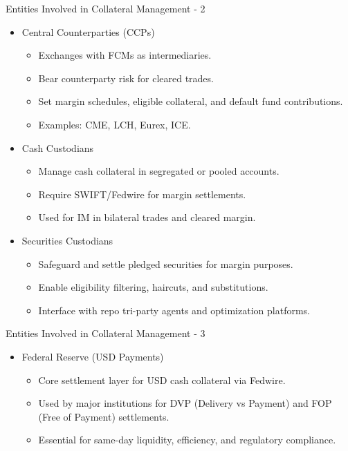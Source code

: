 \documentclass[handout, aspectratio=169]{beamer}
\begin{document}
\begin{frame}{Entities Involved in Collateral Management - 2}
  \begin{itemize}
    \item Central Counterparties (CCPs)
    \begin{itemize}
      \item Exchanges with FCMs as intermediaries.
      \item Bear counterparty risk for cleared trades.
      \item Set margin schedules, eligible collateral, and default fund contributions.
      \item Examples: CME, LCH, Eurex, ICE.
    \end{itemize}
    \item Cash Custodians
    \begin{itemize}
      \item Manage cash collateral in segregated or pooled accounts.
      \item Require SWIFT/Fedwire for margin settlements.
      \item Used for IM in bilateral trades and cleared margin.
    \end{itemize}
    \item Securities Custodians
    \begin{itemize}
      \item Safeguard and settle pledged securities for margin purposes.
      \item Enable eligibility filtering, haircuts, and substitutions.
      \item Interface with repo tri-party agents and optimization platforms.
    \end{itemize}
  \end{itemize}
\end{frame}

\begin{frame}{Entities Involved in Collateral Management - 3}
  \begin{itemize}
    \item Federal Reserve (USD Payments)
    \begin{itemize}
      \item Core settlement layer for USD cash collateral via Fedwire.
      \item Used by major institutions for DVP (Delivery vs Payment) and FOP (Free of Payment) settlements.
      \item Essential for same-day liquidity, efficiency, and regulatory compliance.
    \end{itemize}
  \end{itemize}
\end{frame}
  
\end{document}
